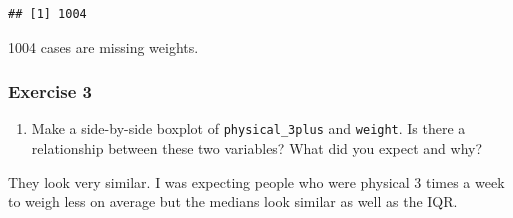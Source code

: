 \documentclass[
]{article}
\newenvironment{Shaded}{\begin{snugshade}}{\end{snugshade}}
\newcommand{\DataTypeTok}[1]{\textcolor[rgb]{0.13,0.29,0.53}{#1}}
\newcommand{\DecValTok}[1]{\textcolor[rgb]{0.00,0.00,0.81}{#1}}
\newcommand{\KeywordTok}[1]{\textcolor[rgb]{0.13,0.29,0.53}{\textbf{#1}}}
\newcommand{\NormalTok}[1]{#1}
\newcommand{\OperatorTok}[1]{\textcolor[rgb]{0.81,0.36,0.00}{\textbf{#1}}}
\newcommand{\StringTok}[1]{\textcolor[rgb]{0.31,0.60,0.02}{#1}}
\providecommand{\tightlist}{%
  \setlength{\itemsep}{0pt}\setlength{\parskip}{0pt}}
\begin{document}
\begin{verbatim}
## [1] 1004
\end{verbatim}

1004 cases are missing weights.

\begin{Shaded}
\end{Shaded}

\hypertarget{exercise-3}{%
\subsubsection{Exercise 3}\label{exercise-3}}

\begin{enumerate}
\def\labelenumi{\arabic{enumi}.}
\tightlist
\item
  Make a side-by-side boxplot of \texttt{physical\_3plus} and
  \texttt{weight}. Is there a relationship between these two variables?
  What did you expect and why?
\end{enumerate}

They look very similar. I was expecting people who were physical 3 times
a week to weigh less on average but the medians look similar as well as
the IQR.

\begin{Shaded}
\end{Shaded}
\end{document}
